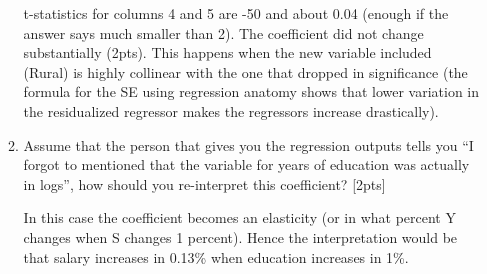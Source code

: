 \documentclass[answers]{exam}
\begin{document}
\begin{enumerate}
\begin{enumerate}[label=\alph*)]
\begin{solution}
t-statistics for columns 4 and 5 are -50 and about 0.04 (enough if the answer says much smaller than 2). The coefficient did not change substantially (2pts). This happens when the new variable included (Rural) is highly collinear with the one that dropped in significance (the formula for the SE using regression anatomy shows that lower variation in the residualized regressor makes the regressors increase drastically). 


\end{solution}

\item Assume that the person that gives you the regression outputs tells you “I forgot to mentioned that the variable for years of education was actually in logs”, how should you re-interpret this coefficient? [2pts]

\begin{solution}
In this case the coefficient becomes an elasticity (or in what percent Y changes when S changes 1 percent). Hence the interpretation would be that salary increases in 0.13\% when education increases in 1\%.  
\end{solution}
\end{enumerate}
 \vspace{2cm}
 
 \clearpage


\end{enumerate}
\end{document}

